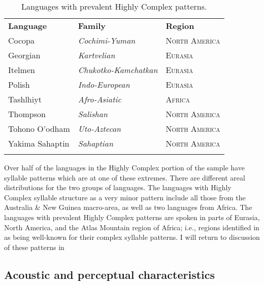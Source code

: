 \begin{table}
\begin{tabularx}{\textwidth}{XXX}
\lsptoprule

\textbf{Language} & \textbf{Family} & \textbf{Region}\\
Cocopa & \textit{Cochimi-Yuman} & \textsc{North} \textsc{America}\\
Georgian & \textit{Kartvelian} & \textsc{Eurasia}\\
Itelmen & \textit{Chukotko-Kamchatkan} & \textsc{Eurasia}\\
Polish & \textit{Indo-European} & \textsc{Eurasia}\\
Tashlhiyt & \textit{Afro-Asiatic} & \textsc{Africa}\\
Thompson & \textit{Salishan} & \textsc{North} \textsc{America}\\
Tohono O’odham & \textit{Uto-Aztecan} & \textsc{North} \textsc{America}\\
Yakima Sahaptin & \textit{Sahaptian} & \textsc{North} \textsc{America}\\
\lspbottomrule
\end{tabularx}
\caption{\label{3.16}Languages with prevalent Highly Complex patterns.}
\end{table}

  Over half of the languages in the Highly Complex portion of the sample have syllable patterns which are at one of these extremes. There are different areal distributions for the two groups of languages. The languages with Highly Complex syllable structure as a very minor pattern include all those from the Australia \& New Guinea macro-area, as well as two languages from Africa. The languages with prevalent Highly Complex patterns are spoken in parts of Eurasia, North America, and the Atlas Mountain region of Africa; i.e., regions identified in  as being well-known for their complex syllable patterns. I will return to discussion of these patterns in 

\subsection{Acoustic and perceptual characteristics}\label{sec:3.4.3}


